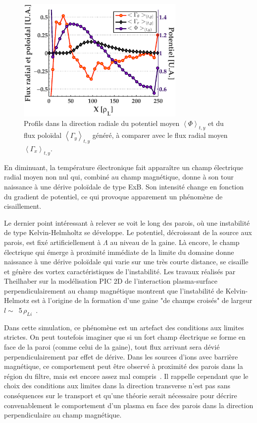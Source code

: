 \begin{refsection}
	\begin{figure}[!htbp]
    \centering
    \includegraphics[height=6cm]{figures/2-profileFluxWhTedNdx.eps}
    \caption{Profils dans la direction radiale du potentiel moyen
    $\left<\Phi\right>_{t,y}$ et du flux poloïdal $\left<\Gamma_y\right>_{t,y}$
    généré, à comparer avec le flux radial moyen
    $\left<\Gamma_x\right>_{t,y}$.\label{2-profileFluxRadialWhTedNdx}}
	\end{figure}

En diminuant, la température électronique fait apparaître un champ électrique
radial moyen non nul qui, combiné au champ magnétique,
donne à son tour naissance à une dérive poloïdale de type ExB. Son
intensité change en fonction du gradient de potentiel, ce qui provoque
apparement un phénomène de cisaillement.

Le dernier point intéressant à relever se voit le long des parois, où une
instabilité de type Kelvin-Helmholtz se développe. Le potentiel, décroissant de
la source aux parois, est fixé artificiellement à $\Lambda$ au niveau de la gaine.
Là encore, le champ électrique qui émerge à proximité immédiate de la limite du
domaine donne naissance à une dérive poloïdale qui varie sur une très courte
distance, se cisaille et génère des vortex caractéristiques de l'instabilité.
Les travaux réalisés par Theilhaber sur la modélisation PIC 2D de l'interaction
plasma-surface perpendiculairement au champ magnétique
 montrent que l'instabilité de Kelvin-Helmotz est à
l'origine de la formation d'une gaine "de champs croisés" de largeur $l\sim\,$
5$\,\rho_{Li}$~\parencite{Theilhaber}.

Dans cette simulation, ce phénomène est un artefact des
conditions aux limites strictes. On peut toutefois imaginer que si un fort
champ électrique se forme en face de la paroi (comme celui de la gaine), tout
flux arrivant sera dévié perpendiculairement par effet de dérive.
Dans les sources d'ions avec barrière magnétique, ce comportement peut être
observé à proximité des parois dans la région du filtre, mais est encore assez
mal compris~\parencite{PIC2D,PIC3D,Kolev}.
Il rappelle cependant que le choix des conditions aux limites dans la direction
transverse n'est pas sans conséquences sur le transport et qu'une théorie
serait nécessaire pour décrire convenablement le comportement d'un plasma
en face des parois dans la direction perpendiculaire au champ magnétique.


\end{refsection}
